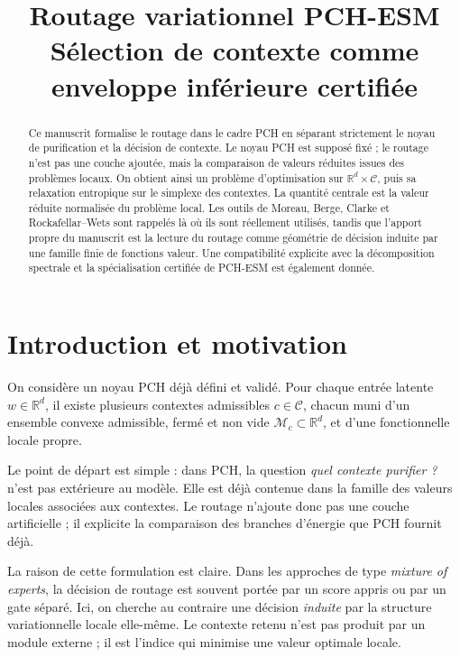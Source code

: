 \documentclass[11pt,a4paper]{article}
\title{Routage variationnel PCH-ESM\\
\large Sélection de contexte comme enveloppe inférieure certifiée}
\author{}
\date{}
\newcommand{\R}{\mathbb R}
\newcommand{\Mcal}{\mathcal M}
\newcommand{\Ccal}{\mathcal C}
\begin{document}
\maketitle

\begin{abstract}
Ce manuscrit formalise le routage dans le cadre PCH en séparant strictement le noyau de purification et la décision de contexte. Le noyau PCH est supposé fixé ; le routage n'est pas une couche ajoutée, mais la comparaison de valeurs réduites issues des problèmes locaux. On obtient ainsi un problème d'optimisation sur \(\R^d\times\Ccal\), puis sa relaxation entropique sur le simplexe des contextes. La quantité centrale est la valeur réduite normalisée du problème local. Les outils de Moreau, Berge, Clarke et Rockafellar--Wets sont rappelés là où ils sont réellement utilisés, tandis que l'apport propre du manuscrit est la lecture du routage comme géométrie de décision induite par une famille finie de fonctions valeur. Une compatibilité explicite avec la décomposition spectrale et la spécialisation certifiée de PCH-ESM est également donnée.
\end{abstract}

\tableofcontents

\section{Introduction et motivation}

On considère un noyau PCH déjà défini et validé. Pour chaque entrée latente \(w\in\R^d\), il existe plusieurs contextes admissibles \(c\in\Ccal\), chacun muni d'un ensemble convexe admissible, fermé et non vide \(\Mcal_c\subset\R^d\), et d'une fonctionnelle locale propre.

Le point de départ est simple : dans PCH, la question \emph{quel contexte purifier ?} n'est pas extérieure au modèle. Elle est déjà contenue dans la famille des valeurs locales associées aux contextes. Le routage n'ajoute donc pas une couche artificielle ; il explicite la comparaison des branches d'énergie que PCH fournit déjà.

La raison de cette formulation est claire. Dans les approches de type \emph{mixture of experts}, la décision de routage est souvent portée par un score appris ou par un gate séparé. Ici, on cherche au contraire une décision \emph{induite} par la structure variationnelle locale elle-même. Le contexte retenu n'est pas produit par un module externe ; il est l'indice qui minimise une valeur optimale locale.
\end{document}
